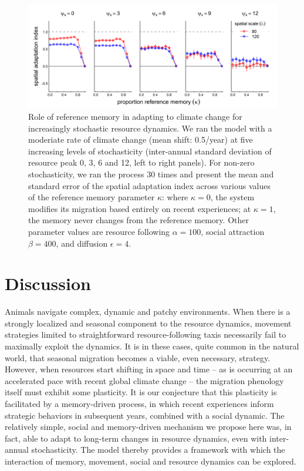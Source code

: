 \documentclass[utf8]{frontiersSCNS} %
\begin{document}
	\begin{figure}
		
	\includegraphics[width=\textwidth]{figures/TrendStochasticity.png}
	
	\caption{ \label{fig_trendstochasticity} Role of reference memory in adapting to climate change for increasingly stochastic resource dynamics. We ran the model with a moderiate rate of climate change (mean shift: 0.5/year) at five increasing levels of stochasticity (inter-annual standard deviation of resource peak 0, 3, 6 and 12, left to right panels). For non-zero stochasticity, we ran the process 30 times and present the mean and standard error of the spatial adaptation index across various values of the reference memory parameter $\kappa$: where $\kappa = 0$, the system modifies its migration based entirely on recent experiences; at $\kappa = 1$, the memory never changes from the reference memory. Other parameter values are resource following $\alpha = 100$, social attraction $\beta = 400$, and diffusion $\epsilon = 4$.}
		
	\end{figure}
	
	\section{Discussion}
	
	Animals navigate complex, dynamic and patchy environments. When there is a strongly localized and seasonal component to the resource dynamics, movement strategies limited to straightforward resource-following taxis necessarily fail to maximally exploit the dynamics. It is in these cases, quite common in the natural world, that seasonal migration becomes a viable, even necessary, strategy.  However, when resources start shifting in space and time -- as is occurring at an accelerated pace with recent global climate change -- the migration phenology itself must exhibit some plasticity. It is our conjecture that this plasticity is facilitated by a memory-driven process, in which recent experiences inform strategic behaviors in subsequent years, combined with a social dynamic. The relatively simple, social and memory-driven mechanism we  propose here was, in fact, able to adapt to long-term changes in resource dynamics, even with inter-annual stochasticity. The model thereby provides a framework with which the interaction  of memory, movement, social and resource dynamics can be explored.	
		
\end{document}
